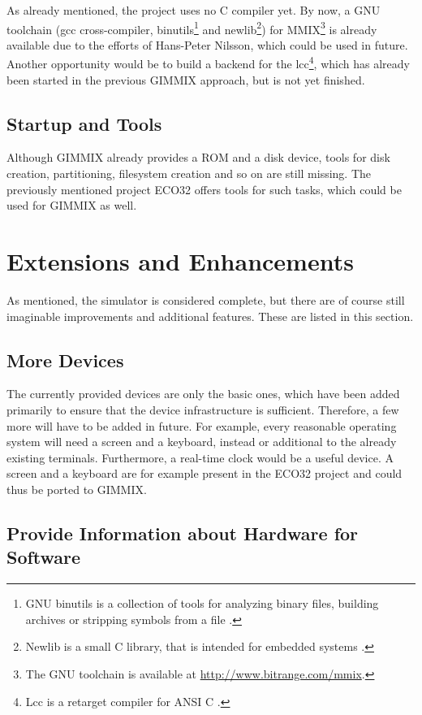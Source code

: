 As already mentioned, the project uses no C compiler yet. By now, a GNU toolchain (\gls{gcc} cross-compiler, binutils\footnote{GNU binutils is a collection of tools for analyzing binary files, building archives or stripping symbols from a file \citep{binutils}.} and newlib\footnote{Newlib is a small C library, that is intended for embedded systems \citep{newlib}.}) for MMIX\footnote{The GNU toolchain is available at \url{http://www.bitrange.com/mmix}.} is already available due to the efforts of Hans-Peter Nilsson, which could be used in future. Another opportunity would be to build a backend for the lcc\footnote{Lcc is a retarget compiler for ANSI C \citep{lcc}.}, which has already been started in the previous GIMMIX approach, but is not yet finished.

\subsection{Startup and Tools}

Although GIMMIX already provides a ROM and a disk device, tools for disk creation, partitioning, filesystem creation and so on are still missing. The previously mentioned project ECO32 offers tools for such tasks, which could be used for GIMMIX as well.

\section{Extensions and Enhancements}

As mentioned, the simulator is considered complete, but there are of course still imaginable improvements and additional features. These are listed in this section.

\subsection{More Devices}

The currently provided devices are only the basic ones, which have been added primarily to ensure that the device infrastructure is sufficient. Therefore, a few more will have to be added in future. For example, every reasonable operating system will need a screen and a keyboard, instead or additional to the already existing terminals. Furthermore, a real-time clock would be a useful device. A screen and a keyboard are for example present in the ECO32 project and could thus be ported to GIMMIX.

\subsection{Provide Information about Hardware for Software}


